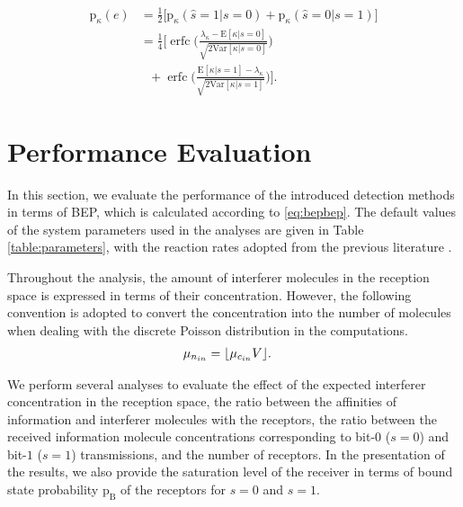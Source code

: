 \documentclass[twocolumn]{IEEEtran}
\newcommand{\p}{\mathrm{p}}
\newcommand{\B}{\mathrm{B}}
\newcommand{\E}{\mathrm{E}}
\newcommand{\Var}{\mathrm{Var}}
\DeclareMathOperator\erfc{erfc}
\DeclarePairedDelimiter\floor{\lfloor}{\rfloor}
\begin{document}
\begin{align} \label{eq:bepbep}
\p_\kappa(e) &=\frac{1}{2} \bigg[ \p_\kappa(\hat{s} = 1|s=0) + \p_\kappa(\hat{s} = 0|s=1) \bigg] \\ \nonumber
&=\frac{1}{4}\Biggl[\erfc \Biggl(\frac{\lambda_\kappa - \E[\kappa|s = 0] }{\sqrt{2 \Var[\kappa|s = 0] }}\Biggr) \\ \nonumber 
&~~~+  \erfc \Biggl(\frac {\E[\kappa|s = 1]  - \lambda_\kappa}{\sqrt{2 \Var[\kappa|s = 1]} }\Biggr)\Biggr]. 
\end{align}

\section{Performance Evaluation}
\label{sec:performance}
In this section, we evaluate the performance of the introduced detection methods in terms of BEP, which is calculated according to \eqref{eq:bepbep}. The default values of the system parameters used in the analyses are given in Table \ref{table:parameters}, with the reaction rates adopted from the previous literature \cite{pierobon2011noise, kuscu2018modeling, bialek2012biophysics}.

Throughout the analysis, the amount of interferer molecules in the reception space is expressed in terms of their concentration. However, the following convention is adopted to convert the concentration into the number of molecules when dealing with the discrete Poisson distribution in the computations. 
\begin{align}
\mu_{n_{in}} &= \floor*{\mu_{c_{in}} V}.
\end{align}


We perform several analyses to evaluate the effect of the expected interferer concentration in the reception space, the ratio between the affinities of information and interferer molecules with the receptors, the ratio between the received information molecule concentrations corresponding to bit-$0$ ($s=0$) and bit-$1$ ($s=1$) transmissions,  and the number of receptors. In the presentation of the results, we also provide the saturation level of the receiver in terms of bound state probability $\p_\B$ of the receptors for $s=0$ and $s=1$. 
\end{document}
